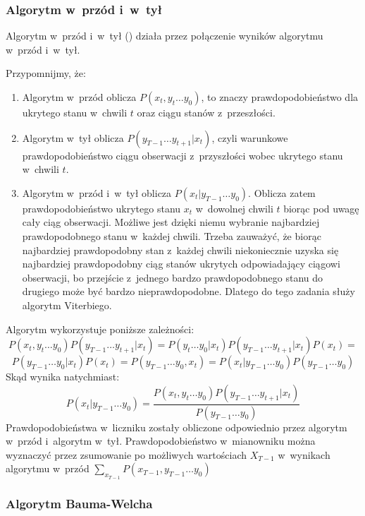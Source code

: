 \subsubsection{Algorytm w~przód i~w~tył}
Algorytm w~przód i~w~tył () działa przez połączenie wyników algorytmu w~przód i~w~tył.

Przypomnijmy, że:

\begin{enumerate}
    \item Algorytm w~przód oblicza $P(x_t, y_t \dots y_0)$, to znaczy prawdopodobieństwo dla ukrytego stanu w~chwili $t$ oraz ciągu stanów z~przeszłości.
    \item Algorytm w~tył oblicza $P(y_{T-1} \dots y_{t+1} | x_t)$, czyli warunkowe prawdopodobieństwo ciągu obserwacji z~przyszłości wobec ukrytego stanu w~chwili $t$.
    \item Algorytm w~przód i~w~tył oblicza $P(x_t | y_{T-1} \dots y_0)$. Oblicza zatem prawdopodobieństwo ukrytego stanu $x_t$ w~dowolnej chwili $t$ biorąc pod uwagę cały ciąg obserwacji. Możliwe jest dzięki niemu wybranie najbardziej prawdopodobnego stanu w~każdej chwili. Trzeba zauważyć, że biorąc najbardziej prawdopodobny stan z~każdej chwili niekoniecznie uzyska się najbardziej prawdopodobny ciąg stanów ukrytych odpowiadający ciągowi obserwacji, bo przejście z~jednego bardzo prawdopodobnego stanu do drugiego może być bardzo nieprawdopodobne. Dlatego do tego zadania służy algorytm Viterbiego.
\end{enumerate}

Algorytm  wykorzystuje poniższe zależności:
$$P(x_t, y_t \dots y_0) P(y_{T-1} \dots y_{t+1} | x_t) = P(y_t \dots y_0 | x_t) P(y_{T-1} \dots y_{t+1} | x_t) P(x_t) = $$
$$P(y_{T-1} \dots y_0 | x_t) P(x_t) = P(y_{T-1} \dots y_0, x_t) = P(x_t | y_{T-1} \dots y_0) P(y_{T-1} \dots y_0)$$
Skąd wynika natychmiast:
$$P(x_t | y_{T-1} \dots y_0) = \frac{P(x_t, y_t \dots y_0) P(y_{T-1} \dots y_{t+1} | x_t)}{P(y_{T-1} \dots y_0)}$$
Prawdopodobieństwa w~liczniku zostały obliczone odpowiednio przez algorytm w~przód i~algorytm w~tył.
Prawdopodobieństwo w~mianowniku można wyznaczyć przez zsumowanie po możliwych wartościach $X_{T-1}$ w~wynikach algorytmu
w~przód $\sum_{x_{T-1}} P(x_{T-1}, y_{T-1} \dots y_0)$

\subsubsection{Algorytm Bauma-Welcha}

